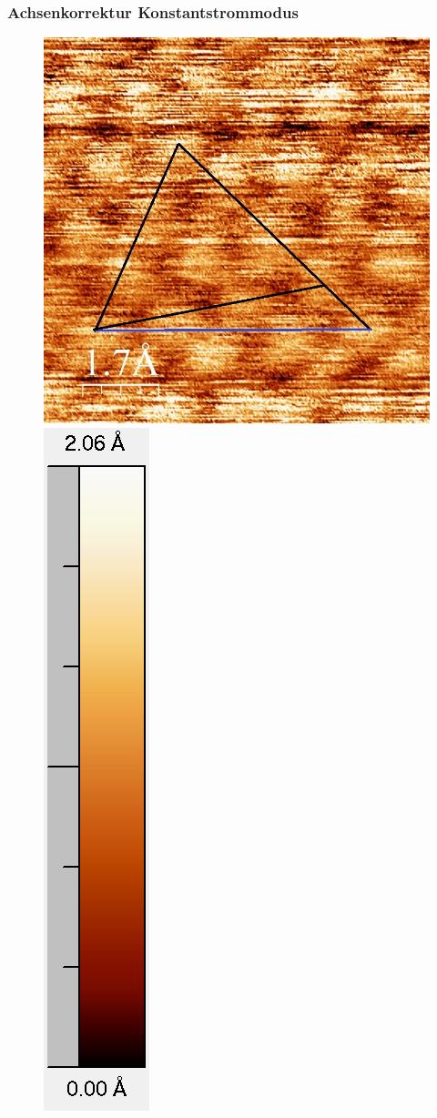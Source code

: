 \documentclass[12pt,a4paper]{article}
\begin{document}
\subsubsection{Achsenkorrektur Konstantstrommodus}
\begin{figure}[H]
\centering
\includegraphics[scale=0.36]{Bilder/Atome/strom1_h.jpg}
\includegraphics[scale=0.48]{Bilder/Atome/strom1_scale.png}

\end{figure}
\end{document}
